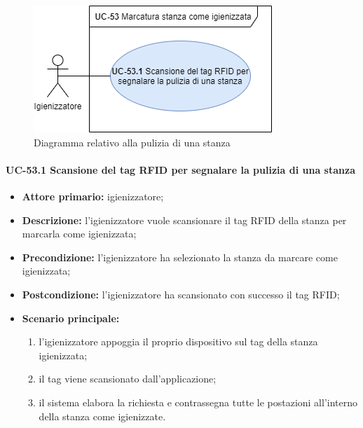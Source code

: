 \begin{figure}[H]
    \centering
        \includegraphics[scale=0.50]{src/CasiDUso/immagini/StanzaIgienizzata.png}
            \caption{Diagramma relativo alla pulizia di una stanza}
    \end{figure}
    

\paragraph{UC-53.1 Scansione del tag RFID per segnalare la pulizia di una stanza}

    \begin{itemize}
        \item \textbf{Attore primario:} igienizzatore;
        \item \textbf{Descrizione:} l’igienizzatore vuole scansionare il tag RFID della stanza per marcarla come igienizzata;
        \item \textbf{Precondizione:} l'igienizzatore ha selezionato la stanza da marcare come igienizzata; 
        \item \textbf{Postcondizione:} l'igienizzatore ha scansionato con successo il tag RFID;
        \item \textbf{Scenario principale:} 
            \begin{enumerate}	
                \item l'igienizzatore appoggia il proprio dispositivo sul tag della stanza igienizzata;
                \item il tag viene scansionato dall'applicazione;
                \item il sistema elabora la richiesta e contrassegna tutte le postazioni all'interno della stanza come igienizzate.
            \end{enumerate}
    \end{itemize}
